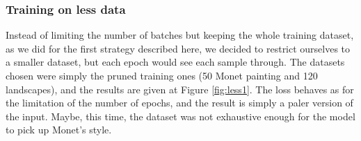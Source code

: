 \documentclass[twocolumn,superscriptaddress,aps,floatfix, nofootinbib]{revtex4-1}
\begin{document}
    \subsubsection{Training on less data}
    
    Instead of limiting the number of batches but keeping the whole training dataset, as we did for the first strategy described here, we decided to restrict ourselves to a smaller dataset, but each epoch would see each sample through. The datasets chosen were simply the pruned training ones (50 Monet painting and 120 landscapes), and the results are given at Figure \ref{fig:less1}. The loss behaves as for the limitation of the number of epochs, and the result is simply a paler version of the input. Maybe, this time, the dataset was not exhaustive enough for the model to pick up Monet's style.
    
\end{document}

